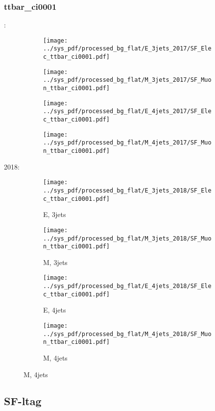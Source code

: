 \documentclass{beamer}
\begin{document}
\begin{frame}
\frametitle{ttbar_ci0001}
\fontsize{5}{1}:
\begin{figure}
\centering
\begin{subfigure}[b]{0.24\textwidth}
\texttt{[image: ../sys\_pdf/processed\_bg\_flat/E\_3jets\_2017/SF\_Elec\_ttbar\_ci0001.pdf]}
\end{subfigure}
\begin{subfigure}[b]{0.24\textwidth}
\texttt{[image: ../sys\_pdf/processed\_bg\_flat/M\_3jets\_2017/SF\_Muon\_ttbar\_ci0001.pdf]}
\end{subfigure}
\begin{subfigure}[b]{0.24\textwidth}
\texttt{[image: ../sys\_pdf/processed\_bg\_flat/E\_4jets\_2017/SF\_Elec\_ttbar\_ci0001.pdf]}
\end{subfigure}
\begin{subfigure}[b]{0.24\textwidth}
\texttt{[image: ../sys\_pdf/processed\_bg\_flat/M\_4jets\_2017/SF\_Muon\_ttbar\_ci0001.pdf]}
\end{subfigure}
\end{figure}
2018:
\begin{figure}
\centering
\begin{subfigure}[b]{0.24\textwidth}
\texttt{[image: ../sys\_pdf/processed\_bg\_flat/E\_3jets\_2018/SF\_Elec\_ttbar\_ci0001.pdf]}
\captionsetup{font=tiny}
\caption{E, 3jets}
\end{subfigure}
\begin{subfigure}[b]{0.24\textwidth}
\texttt{[image: ../sys\_pdf/processed\_bg\_flat/M\_3jets\_2018/SF\_Muon\_ttbar\_ci0001.pdf]}
\captionsetup{font=tiny}
\caption{M, 3jets}
\end{subfigure}
\begin{subfigure}[b]{0.24\textwidth}
\texttt{[image: ../sys\_pdf/processed\_bg\_flat/E\_4jets\_2018/SF\_Elec\_ttbar\_ci0001.pdf]}
\captionsetup{font=tiny}
\caption{E, 4jets}
\end{subfigure}
\begin{subfigure}[b]{0.24\textwidth}
\texttt{[image: ../sys\_pdf/processed\_bg\_flat/M\_4jets\_2018/SF\_Muon\_ttbar\_ci0001.pdf]}
\captionsetup{font=tiny}
\caption{M, 4jets}
\end{subfigure}
\end{figure}
\end{frame}


\subsection{SF-ltag}
\end{document}

